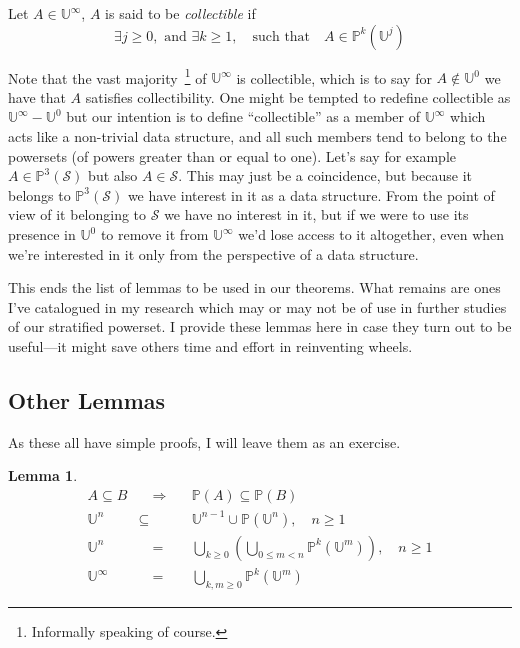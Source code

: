 \documentclass[twoside]{article}
\newcommand{\powerset}[2][P]{\ensuremath{\mathbb{#1}(#2)}}
\newcommand{\nthps}[2][P]{\ensuremath{\mathbb{#1}^{#2}}}
\newcommand{\nthus}[2][U]{\ensuremath{\mathbb{#1}^{#2}}}
\newcommand{\stratified}{\ensuremath{\mathbb{U}^\infty}}
\newcommand{\of}[1]{\ensuremath{(\mathcal{#1})}}
\newcommand{\then}{\ensuremath{\quad\Longrightarrow\quad}}
\newcommand{\equals}{\ensuremath{\quad =\quad}}
\newtheorem{lemma}[theorem]{Lemma}
\newenvironment{definition}[1][Definition]{\begin{trivlist}
\item[\hskip \labelsep {\bfseries #1:}]}{\end{trivlist}}
\begin{document}
\begin{definition}[Collectibles]
Let $ A\in\stratified $, $ A $ is said to be \emph{collectible} if
$$ \exists j\ge 0, \mbox{ and }\exists k\ge 1,\quad\mbox{such that}\quad A\in\nthps{k}(\nthus{j}) $$
\end{definition}
Note that the vast majority\ \footnote{Informally speaking of course.} of $ \stratified $ is collectible, which is to
say for $ A\not\in\nthus{0} $ we have that $ A $ satisfies collectibility.  One might be tempted to redefine collectible
as $ \stratified-\nthus{0} $ but our intention is to define ``collectible'' as a member of $ \stratified $ which acts
like a non-trivial data structure, and all such members tend to belong to the powersets (of powers greater than or equal
to one).  Let's say for example $ A\in\nthps{3}\of{S} $ but also $ A\in\mathcal{S} $. This may just be a coincidence,
but because it belongs to $ \nthps{3}\of{S} $ we have interest in it as a data structure. From the point of view of
it belonging to $ \mathcal{S} $ we have no interest in it, but if we were to use its presence in $ \nthus{0} $ to remove
it from $ \stratified $ we'd lose access to it altogether, even when we're interested in it only from the perspective of
a data structure.

This ends the list of lemmas to be used in our theorems. What remains are ones I've catalogued in my research
which may or may not be of use in further studies of our stratified powerset. I provide these lemmas here in case
they turn out to be useful---it might save others time and effort in reinventing wheels.

\subsection*{Other Lemmas}

As these all have simple proofs, I will leave them as an exercise.
\begin{lemma}\
\begin{eqnarray}
A\subseteq B & \then & \powerset{A}\subseteq\powerset{B} \\[0.5cm]
\nthus{n} & \subseteq & \nthus{n-1}\cup\powerset{\nthus{n}},\quad n\ge 1 \\[0.2cm]
\nthus{n} & \equals & \bigcup_{k\ge 0}\left(\bigcup_{0\le m < n}\nthps{k}(\nthus{m})\right),\quad n\ge 1 \\[0.2cm]
\stratified & \equals & \bigcup_{k,m\ge 0}\nthps{k}(\nthus{m})
\end{eqnarray}
\end{lemma}
\end{document}
